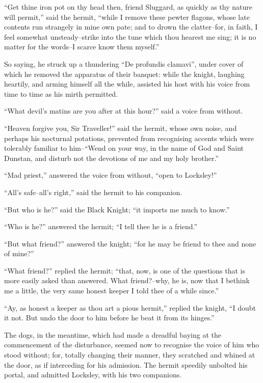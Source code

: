 ``Get thine iron pot on thy head then, friend Sluggard, as quickly as
thy nature will permit,'' said the hermit, ``while I remove these pewter
flagons, whose late contents run strangely in mine own pate; and to
drown the clatter--for, in faith, I feel somewhat unsteady--strike into
the tune which thou hearest me sing; it is no matter for the words--I
scarce know them myself.''

So saying, he struck up a thundering ``De profundis clamavi'', under
cover of which he removed the apparatus of their banquet: while the
knight, laughing heartily, and arming himself all the while, assisted
his host with his voice from time to time as his mirth permitted.

``What devil's matins are you after at this hour?'' said a voice from
without.

``Heaven forgive you, Sir Traveller!'' said the hermit, whose own noise,
and perhaps his nocturnal potations, prevented from recognising accents
which were tolerably familiar to him--``Wend on your way, in the name of
God and Saint Dunstan, and disturb not the devotions of me and my holy
brother.''

``Mad priest,'' answered the voice from without, ``open to Locksley!''

``All's safe--all's right,'' said the hermit to his companion.

``But who is he?'' said the Black Knight; ``it imports me much to
know.''

``Who is he?'' answered the hermit; ``I tell thee he is a friend.''

``But what friend?'' answered the knight; ``for he may be friend to thee
and none of mine?''

``What friend?'' replied the hermit; ``that, now, is one of the
questions that is more easily asked than answered. What friend?--why, he
is, now that I bethink me a little, the very same honest keeper I told
thee of a while since.''

``Ay, as honest a keeper as thou art a pious hermit,'' replied the
knight, ``I doubt it not. But undo the door to him before he beat it
from its hinges.''

The dogs, in the meantime, which had made a dreadful baying at the
commencement of the disturbance, seemed now to recognise the voice of
him who stood without; for, totally changing their manner, they
scratched and whined at the door, as if interceding for his admission.
The hermit speedily unbolted his portal, and admitted Locksley, with his
two companions.


